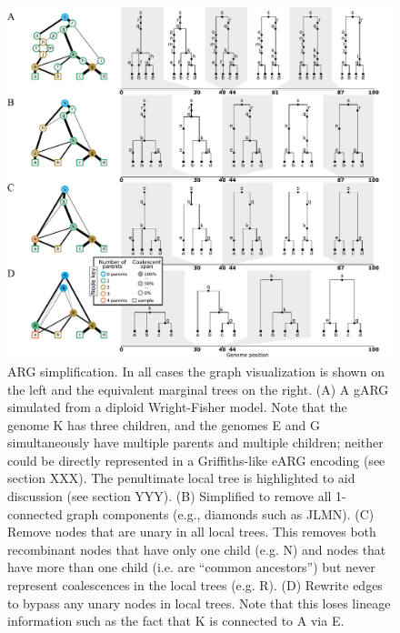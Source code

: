 \documentclass{article}
\begin{document}
\begin{figure}
\centering
\vspace{5em}
\includegraphics[width=\linewidth]{illustrations/simplification}
\caption{\label{fig-simplification}
ARG simplification. In all cases the graph visualization is shown on the left
and the equivalent marginal trees on the right.
(A) A gARG simulated from a diploid Wright-Fisher
model. Note that the genome \textsf{K} has three children, and the genomes
\textsf{E} and \textsf{G} simultaneously have multiple parents and multiple children;
neither could be directly represented in a Griffiths-like eARG encoding
(see section XXX). The penultimate local tree is highlighted to aid discussion (see section YYY).
(B) Simplified to remove all
1-connected graph components (e.g., diamonds such as \textsf{JLMN}).
(C) Remove nodes that are unary in all local trees. This removes both recombinant nodes
that have only one child (e.g. \textsf{N}) and nodes that have more
than one child (i.e. are ``common ancestors'') but never represent coalescences
in the local trees (e.g. \textsf{R}).
(D) Rewrite edges to bypass any unary nodes in local trees. Note that this loses lineage
information such as the fact that \textsf{K} is connected to \textsf{A} via \textsf{E}.
}
\end{figure}

\end{document}
